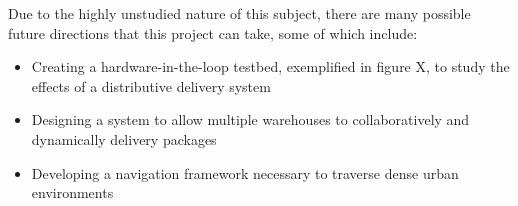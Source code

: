 Due to the highly unstudied nature of this subject, there are many possible future directions that this project can take, some of which include:

\begin{itemize}
\item{Creating a hardware-in-the-loop testbed, exemplified in figure X, to study the effects of a distributive delivery system}

\item{Designing a system to allow multiple warehouses to collaboratively and dynamically delivery packages}

\item{Developing a navigation framework necessary to traverse dense urban environments}

\end{itemize}
